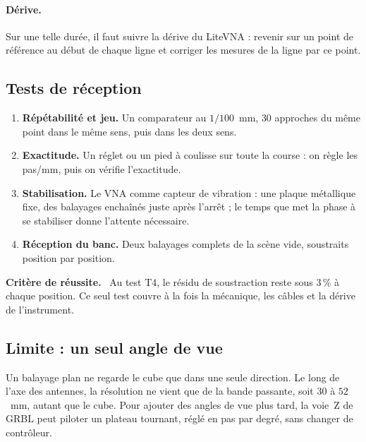 \documentclass[11pt,a4paper]{article}
\newenvironment{critere}%
  {\par\medskip\begin{lrbox}{\critbox}\begin{minipage}{0.95\textwidth}%
   \textbf{Critère de réussite.}\ }%
  {\end{minipage}\end{lrbox}\noindent\fbox{\usebox{\critbox}}\par\medskip}
\begin{document}
\paragraph{Dérive.}
Sur une telle durée, il faut suivre la dérive du LiteVNA : revenir sur un point de
référence au début de chaque ligne et corriger les mesures de la ligne par ce
point.

\subsection{Tests de réception}

\begin{enumerate}[label=\textbf{T\arabic*}]
\item \textbf{Répétabilité et jeu.} Un comparateur au $1/100$~mm, $30$ approches
      du même point dans le même sens, puis dans les deux sens.
\item \textbf{Exactitude.} Un réglet ou un pied à coulisse sur toute la course :
      on règle les pas/mm, puis on vérifie l'exactitude.
\item \textbf{Stabilisation.} Le VNA comme capteur de vibration : une plaque
      métallique fixe, des balayages enchaînés juste après l'arrêt ; le temps que
      met la phase à se stabiliser donne l'attente nécessaire.
\item \textbf{Réception du banc.} Deux balayages complets de la scène vide,
      soustraits position par position.
\end{enumerate}

\begin{critere}
Au test T4, le résidu de soustraction reste sous $3\,\%$ à chaque position. Ce
seul test couvre à la fois la mécanique, les câbles et la dérive de
l'instrument.
\end{critere}

\subsection{Limite : un seul angle de vue}

Un balayage plan ne regarde le cube que dans une seule direction. Le long de l'axe
des antennes, la résolution ne vient que de la bande passante, soit $30$ à
$52$~mm, autant que le cube. Pour ajouter des angles de vue plus tard, la voie~Z
de GRBL peut piloter un plateau tournant, réglé en pas par degré, sans changer de
contrôleur.
\end{document}
